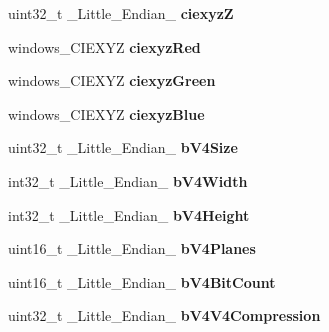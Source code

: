 \begin{DoxyCompactItemize}
\item 
\hypertarget{structGCC__ATTRIBUTE_aeba1e4b7ca3bc23548dbdf287c79590b}{uint32\-\_\-t \-\_\-\-Little\-\_\-\-Endian\-\_\- {\bfseries ciexyz\-Z}}\label{structGCC__ATTRIBUTE_aeba1e4b7ca3bc23548dbdf287c79590b}

\item 
\hypertarget{structGCC__ATTRIBUTE_a04a38414e8f4080700a43e6640b597c6}{windows\-\_\-\-C\-I\-E\-X\-Y\-Z {\bfseries ciexyz\-Red}}\label{structGCC__ATTRIBUTE_a04a38414e8f4080700a43e6640b597c6}

\item 
\hypertarget{structGCC__ATTRIBUTE_a22efeb12469b78ad2f51cf98755eaa0a}{windows\-\_\-\-C\-I\-E\-X\-Y\-Z {\bfseries ciexyz\-Green}}\label{structGCC__ATTRIBUTE_a22efeb12469b78ad2f51cf98755eaa0a}

\item 
\hypertarget{structGCC__ATTRIBUTE_a72349936079047b86b519c5afc19bcc5}{windows\-\_\-\-C\-I\-E\-X\-Y\-Z {\bfseries ciexyz\-Blue}}\label{structGCC__ATTRIBUTE_a72349936079047b86b519c5afc19bcc5}

\item 
\hypertarget{structGCC__ATTRIBUTE_a5c34946220d940ddef4f9b29f1c5cca0}{uint32\-\_\-t \-\_\-\-Little\-\_\-\-Endian\-\_\- {\bfseries b\-V4\-Size}}\label{structGCC__ATTRIBUTE_a5c34946220d940ddef4f9b29f1c5cca0}

\item 
\hypertarget{structGCC__ATTRIBUTE_a0eb1b2607cd988dcffbd954d790c482b}{int32\-\_\-t \-\_\-\-Little\-\_\-\-Endian\-\_\- {\bfseries b\-V4\-Width}}\label{structGCC__ATTRIBUTE_a0eb1b2607cd988dcffbd954d790c482b}

\item 
\hypertarget{structGCC__ATTRIBUTE_aac0bceceda091a56c190a7ee2a95b556}{int32\-\_\-t \-\_\-\-Little\-\_\-\-Endian\-\_\- {\bfseries b\-V4\-Height}}\label{structGCC__ATTRIBUTE_aac0bceceda091a56c190a7ee2a95b556}

\item 
\hypertarget{structGCC__ATTRIBUTE_a229bfc8502fdc9f4c35dfa6ac8b4d2de}{uint16\-\_\-t \-\_\-\-Little\-\_\-\-Endian\-\_\- {\bfseries b\-V4\-Planes}}\label{structGCC__ATTRIBUTE_a229bfc8502fdc9f4c35dfa6ac8b4d2de}

\item 
\hypertarget{structGCC__ATTRIBUTE_ac5d534ed26a936f4d92ddff87858a733}{uint16\-\_\-t \-\_\-\-Little\-\_\-\-Endian\-\_\- {\bfseries b\-V4\-Bit\-Count}}\label{structGCC__ATTRIBUTE_ac5d534ed26a936f4d92ddff87858a733}

\item 
\hypertarget{structGCC__ATTRIBUTE_ad5b6bbe933be97bf3872de5c5b0daf4a}{uint32\-\_\-t \-\_\-\-Little\-\_\-\-Endian\-\_\- {\bfseries b\-V4\-V4\-Compression}}\label{structGCC__ATTRIBUTE_ad5b6bbe933be97bf3872de5c5b0daf4a}


\end{DoxyCompactItemize}
